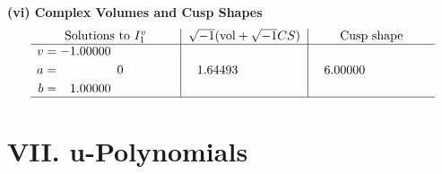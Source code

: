 \documentclass[1p]{elsarticle_modified}
\theoremstyle{definition}
\newcommand{\I}{\sqrt{-1}}
\begin{document}
\newpage\flushleft \textbf{(vi) Complex Volumes and Cusp Shapes}
$$\begin{array}{c|c|c}  
\text{Solutions to }I^v_{1}& \I (\text{vol} + \sqrt{-1}CS) & \text{Cusp shape}\\
 \hline 
\begin{aligned}
v &= -1.00000\phantom{ +0.000000I} \\
a &= \phantom{-0.000000 } 0 \\
b &= \phantom{-}1.00000\phantom{ +0.000000I}\end{aligned}
 & \phantom{-}1.64493\phantom{ +0.000000I} & \phantom{-}6.00000\phantom{ +0.000000I}\\
 \hline 
 \end{array}$$\newpage
\newpage\renewcommand{\arraystretch}{1}
\centering \section*{ VII. u-Polynomials}
\end{document}

